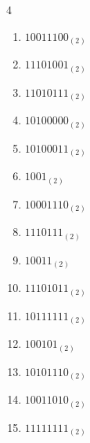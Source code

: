 \begin{multicols}{4}
\begin{enumerate}
        \phantom{$=158$}

  \item $10011100_{(2)}$

        \phantom{$=156$}

\columnbreak %

  \item $11101001_{(2)}$

        \phantom{$=233$}

  \item $11010111_{(2)}$

        \phantom{$=215$}

  \item $10100000_{(2)}$

        \phantom{$=160$}

  \item $10100011_{(2)}$

        \phantom{$=163$}

  \item $1001_{(2)}$

        \phantom{$=9$}

  \item $10001110_{(2)}$

        \phantom{$=142$}

  \item $1110111_{(2)}$

        \phantom{$=119$}

  \item $10011_{(2)}$

        \phantom{$=19$}

  \item $11101011_{(2)}$

        \phantom{$=235$}

  \item $10111111_{(2)}$

        \phantom{$=191$}

  \item $100101_{(2)}$

        \phantom{$=37$}

  \item $10101110_{(2)}$

        \phantom{$=174$}

  \item $10011010_{(2)}$

        \phantom{$=154$}

  \item $11111111_{(2)}$


\end{enumerate}
\end{multicols}
